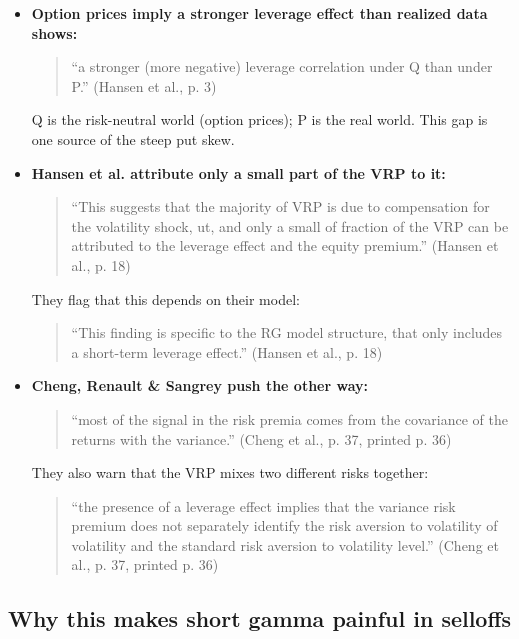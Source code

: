 \documentclass{article}
\begin{document}
\begin{itemize}

\item \textbf{Option prices imply a stronger leverage effect than realized data shows:}

\begin{quote}``a stronger (more negative) leverage correlation under Q than under P.'' (Hansen et al., p. 3)\end{quote}

Q is the risk-neutral world (option prices); P is the real world. This gap is one source of the steep put skew.

\item \textbf{Hansen et al. attribute only a small part of the VRP to it:}

\begin{quote}``This suggests that the majority of VRP is due to compensation for the volatility shock, ut, and only a small of fraction of the VRP can be attributed to the leverage effect and the equity premium.'' (Hansen et al., p. 18)\end{quote}

They flag that this depends on their model:

\begin{quote}``This finding is specific to the RG model structure, that only includes a short-term leverage effect.'' (Hansen et al., p. 18)\end{quote}

\item \textbf{Cheng, Renault \& Sangrey push the other way:}

\begin{quote}``most of the signal in the risk premia comes from the covariance of the returns with the variance.'' (Cheng et al., p. 37, printed p. 36)\end{quote}

They also warn that the VRP mixes two different risks together:

\begin{quote}``the presence of a leverage effect implies that the variance risk premium does not separately identify the risk aversion to volatility of volatility and the standard risk aversion to volatility level.'' (Cheng et al., p. 37, printed p. 36)\end{quote}

\end{itemize}

\subsection{Why this makes short gamma painful in selloffs}
\end{document}
